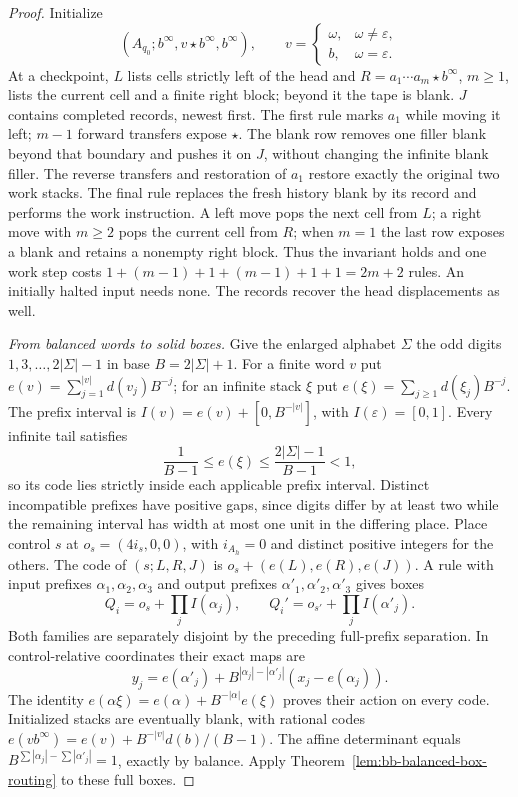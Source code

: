 \begin{proof}
Initialize
\[
 (A_{q_0};b^\infty,v\star b^\infty,b^\infty),\qquad
 v=\begin{cases}\omega,&\omega\ne\varepsilon,\\b,&\omega=\varepsilon.
 \end{cases}
\]
At a checkpoint, $L$ lists cells strictly left of the head and
$R=a_1\cdots a_m\star b^\infty$, $m\ge1$, lists the current cell
and a finite right block; beyond it the tape is blank.  $J$ contains
completed records, newest first.  The first rule marks $a_1$ while
moving it left; $m-1$ forward transfers expose $\star$.  The blank
row removes one filler blank beyond that boundary and pushes it on
$J$, without changing the infinite blank filler.  The reverse transfers
and restoration of $a_1$ restore exactly the original two work stacks.
The final rule replaces the fresh history blank by its record and
performs the work instruction.  A left move pops the next cell from
$L$; a right move with $m\ge2$ pops the current cell from $R$;
when $m=1$ the last row exposes a blank and retains a nonempty right
block.  Thus the invariant holds and one work step costs
$1+(m-1)+1+(m-1)+1+1=2m+2$ rules.  An initially halted input needs
none.  The records recover the head displacements as well.

\emph{From balanced words to solid boxes.}
Give the enlarged alphabet $\Sigma$ the odd digits
$1,3,\ldots,2|\Sigma|-1$ in base $B=2|\Sigma|+1$.
For a finite word $v$ put $e(v)=\sum_{j=1}^{|v|}d(v_j)B^{-j}$;
for an infinite stack $\xi$ put
$e(\xi)=\sum_{j\ge1}d(\xi_j)B^{-j}$.
The prefix interval is $I(v)=e(v)+[0,B^{-|v|}]$, with
$I(\varepsilon)=[0,1]$.  Every infinite tail satisfies
\[
 \frac1{B-1}\le e(\xi)\le\frac{2|\Sigma|-1}{B-1}<1,
\]
so its code lies strictly inside each applicable prefix interval.
Distinct incompatible prefixes have positive gaps, since digits differ
by at least two while the remaining interval has width at most one unit
in the differing place. Place control $s$ at
$o_s=(4i_s,0,0)$, with $i_{A_h}=0$ and distinct positive integers
for the others.  The code of $(s;L,R,J)$ is
$o_s+(e(L),e(R),e(J))$.
A rule with input prefixes $\alpha_1,\alpha_2,\alpha_3$
and output prefixes $\alpha'_1,\alpha'_2,\alpha'_3$ gives boxes
\[
 Q_i=o_s+\prod_jI(\alpha_j),\qquad
 Q_i'=o_{s'}+\prod_jI(\alpha'_j).
\]
Both families are separately disjoint by the preceding full-prefix
separation.  In control-relative coordinates their exact maps are
\begin{equation}\label{eq:bb-balanced-affine-rule}
 y_j=e(\alpha'_j)+B^{|\alpha_j|-|\alpha'_j|}
                    (x_j-e(\alpha_j)).
\end{equation}
The identity $e(\alpha\xi)=e(\alpha)+B^{-|\alpha|}e(\xi)$
proves their action on every code.  Initialized stacks are eventually
blank, with rational codes
$e(vb^\infty)=e(v)+B^{-|v|}d(b)/(B-1)$.
The affine determinant equals
$B^{\sum|\alpha_j|-\sum|\alpha'_j|}=1$, exactly by balance.
Apply Theorem~\ref{lem:bb-balanced-box-routing} to these full boxes.


\end{proof}
